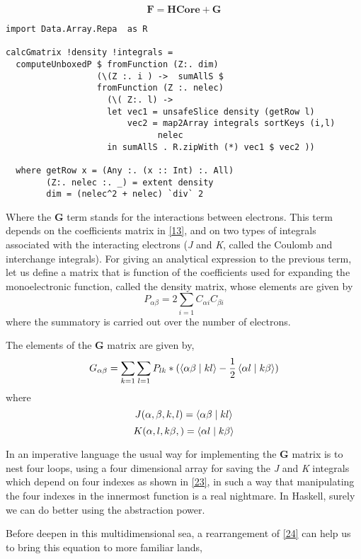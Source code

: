 \documentclass{tmr}
\begin{document}
\begin{equation}\label{22}
 \mathbf{F} = \mathbf{HCore} + \mathbf{G}
\end{equation}

\begin{lstlisting}[float,captionpos=b,belowcaptionskip=4pt, caption= Computation of the  G matrix]
import Data.Array.Repa  as R

calcGmatrix !density !integrals =
  computeUnboxedP $ fromFunction (Z:. dim)
                  (\(Z :. i ) ->  sumAllS $
                  fromFunction (Z :. nelec)
                    (\( Z:. l) ->
                    let vec1 = unsafeSlice density (getRow l)
                        vec2 = map2Array integrals sortKeys (i,l)
                              nelec
                    in sumAllS . R.zipWith (*) vec1 $ vec2 ))

  where getRow x = (Any :. (x :: Int) :. All)
        (Z:. nelec :. _) = extent density
        dim = (nelec^2 + nelec) `div` 2

\end{lstlisting}

Where the \textbf{G} term stands for the interactions between electrons.
This term depends on the coefficients matrix in \eqref{13},
and on two types of integrals associated with the interacting electrons 
(\textit{J} and \textit{K}, called the Coulomb and interchange integrals).
For giving an analytical expression to the previous term, let us define 
a matrix that is function of the coefficients used for expanding the
monoelectronic function, called the density matrix, whose elements
are given by
\begin{equation}\label{23}
 P_{\alpha \beta} = 2\sum_{i=1} C_{\alpha i} C_{\beta i}
\end{equation}
where the summatory is carried out over the number of electrons.

The elements of the  \textbf{G} matrix are given by,
\begin{equation}\label{24}
 G_{\alpha \beta} = \sum_{k=1}\sum_{l=1} P_{lk} * 
(\braket{\alpha\beta \mid kl} - \frac{1}{2} \braket{\alpha l \mid k \beta })
\end{equation}
where
\[J(\alpha,\beta,k,l) = \braket{\alpha\beta \mid kl} \]
\[K(\alpha,l,k\beta,) = \braket{\alpha l \mid k \beta}\]

In an imperative language the usual way for implementing the \textbf{G} matrix
is to nest four loops, using a four dimensional array for saving the \textit{J} and \textit{K}
integrals which depend on four indexes as shown in \eqref{23}, in such a way that manipulating 
the four indexes in the innermost function is a real nightmare. In Haskell, surely we can do
better using the abstraction power. 
\par Before deepen in this multidimensional sea, a  rearrangement of \eqref{24} can help us
to bring this equation to more familiar lands,
\end{document}
